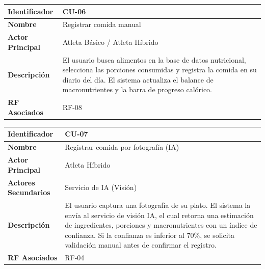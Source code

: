 \documentclass[12pt]{article}
\begin{document}
\begin{table}[h!]
    \centering
    \renewcommand{\arraystretch}{1.3}
    \begin{tabular}{|p{3.5cm}|p{11.5cm}|}
        \hline
        \rowcolor[HTML]{EFEFEF}
        \textbf{Identificador} & \textbf{CU-06} \\ \hline
        \textbf{Nombre} & Registrar comida manual \\ \hline
        \textbf{Actor Principal} & Atleta Básico / Atleta Híbrido \\ \hline
        \textbf{Descripción} & El usuario busca alimentos en la base de datos nutricional, selecciona las porciones consumidas y registra la comida en su diario del día. El sistema actualiza el balance de macronutrientes y la barra de progreso calórico. \\ \hline
        \textbf{RF Asociados} & RF-08 \\ \hline
    \end{tabular}
\end{table}
\newpage
\begin{table}[h!]
    \centering
    \renewcommand{\arraystretch}{1.3}
    \begin{tabular}{|p{3.5cm}|p{11.5cm}|}
        \hline
        \rowcolor[HTML]{EFEFEF}
        \textbf{Identificador} & \textbf{CU-07} \\ \hline
        \textbf{Nombre} & Registrar comida por fotografía (IA) \\ \hline
        \textbf{Actor Principal} & Atleta Híbrido \\ \hline
        \textbf{Actores Secundarios} & Servicio de IA (Visión) \\ \hline
        \textbf{Descripción} & El usuario captura una fotografía de su plato. El sistema la envía al servicio de visión IA, el cual retorna una estimación de ingredientes, porciones y macronutrientes con un índice de confianza. Si la confianza es inferior al 70\%, se solicita validación manual antes de confirmar el registro. \\ \hline
        \textbf{RF Asociados} & RF-04 \\ \hline
    \end{tabular}
\end{table}
\end{document}
